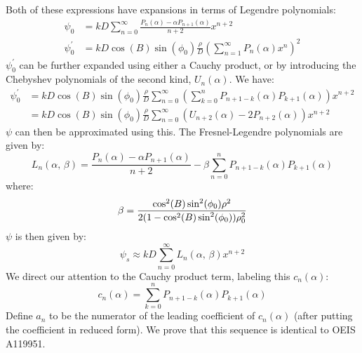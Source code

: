 \documentclass{article}
\theoremstyle{plain}
\begin{document}
        Both of these expressions have expansions in terms of Legendre
        polynomials:
        \begin{subequations}
            \begin{align}
                \psi_{0}
                &=kD\sum_{n=0}^{\infty}
                    \frac{P_{n}(\alpha)-\alpha{P}_{n+1}(\alpha)}{n+2}x^{n+2}\\
                \psi^{\prime}_{0}
                &=kD\cos(B)\sin(\phi_{0})\frac{\rho}{D}\left(
                    \sum_{n=1}^{\infty}P_{n}(\alpha)x^{n}
                \right)^{2}
            \end{align}
        \end{subequations}
        $\psi^{\prime}_{0}$ can be further expanded using either a Cauchy
        product, or by introducing the Chebyshev polynomials of the second kind,
        $U_{n}(\alpha)$. We have:
        \begin{subequations}
            \begin{align}
                \psi^{\prime}_{0}
                &=kD\cos(B)\sin(\phi_{0})\frac{\rho}{D}
                    \sum_{n=0}^{\infty}\left(
                        \sum_{k=0}^{n}P_{n+1-k}(\alpha)P_{k+1}(\alpha)
                    \right)x^{n+2}\\
                    &=kD\cos(B)\sin(\phi_{0})\frac{\rho}{D}
                    \sum_{n=0}^{\infty}\left(
                        U_{n+2}(\alpha)-2P_{n+2}(\alpha)
                    \right)x^{n+2}
            \end{align}
        \end{subequations}
        $\psi$ can then be approximated using this. The Fresnel-Legendre
        polynomials are given by:
        \begin{equation}
            \label{eqn:fresnel_legendre_coeffs}
            L_{n}(\alpha,\,\beta)
            =\frac{P_{n}(\alpha)-\alpha{P}_{n+1}(\alpha)}{n+2}
                -\beta\sum_{n=0}^{n}P_{n+1-k}(\alpha)P_{k+1}(\alpha)
        \end{equation}
        where:
        \begin{equation}
            \beta=
            \frac{%
                \cos^{2}(B)\sin^{2}(\phi_{0})\rho^{2}
            }{%
                2(1-\cos^{2}(B)\sin^{2}(\phi_{0}))\rho_{0}^{2}
            }
        \end{equation}
        $\psi$ is then given by:
        \begin{equation}
            \psi_{s}\approx
            kD\sum_{n=0}^{\infty}L_{n}(\alpha,\,\beta)x^{n+2}
        \end{equation}
        We direct our attention to the Cauchy product term, labeling this
        $c_{n}(\alpha)$:
        \begin{equation}
            c_{n}(\alpha)=\sum_{k=0}^{n}P_{n+1-k}(\alpha)P_{k+1}(\alpha)
        \end{equation}
        Define $a_{n}$ to be the numerator of the leading coefficient of
        $c_{n}(\alpha)$ (after putting the coefficient in reduced form).
        We prove that this sequence is identical to OEIS A119951.
\end{document}
